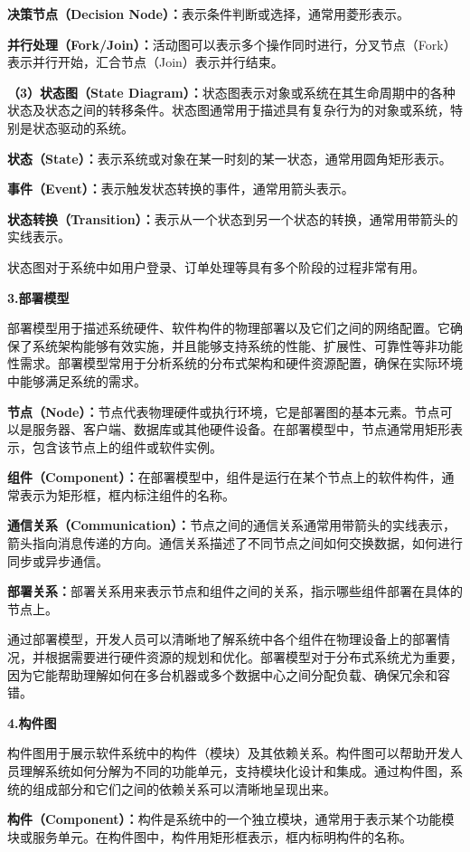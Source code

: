 \textbf{决策节点（Decision Node）：}表示条件判断或选择，通常用菱形表示。

\textbf{并行处理（Fork/Join）：}活动图可以表示多个操作同时进行，分叉节点（Fork）表示并行开始，汇合节点（Join）表示并行结束。

\textbf{（3）状态图（State Diagram）：}状态图表示对象或系统在其生命周期中的各种状态及状态之间的转移条件。状态图通常用于描述具有复杂行为的对象或系统，特别是状态驱动的系统。

\textbf{状态（State）：}表示系统或对象在某一时刻的某一状态，通常用圆角矩形表示。

\textbf{事件（Event）：}表示触发状态转换的事件，通常用箭头表示。

\textbf{状态转换（Transition）：}表示从一个状态到另一个状态的转换，通常用带箭头的实线表示。

状态图对于系统中如用户登录、订单处理等具有多个阶段的过程非常有用。

\textbf{3.部署模型}

部署模型用于描述系统硬件、软件构件的物理部署以及它们之间的网络配置。它确保了系统架构能够有效实施，并且能够支持系统的性能、扩展性、可靠性等非功能性需求。部署模型常用于分析系统的分布式架构和硬件资源配置，确保在实际环境中能够满足系统的需求。

\textbf{节点（Node）：}节点代表物理硬件或执行环境，它是部署图的基本元素。节点可以是服务器、客户端、数据库或其他硬件设备。在部署模型中，节点通常用矩形表示，包含该节点上的组件或软件实例。

\textbf{组件（Component）：}在部署模型中，组件是运行在某个节点上的软件构件，通常表示为矩形框，框内标注组件的名称。

\textbf{通信关系（Communication）：}节点之间的通信关系通常用带箭头的实线表示，箭头指向消息传递的方向。通信关系描述了不同节点之间如何交换数据，如何进行同步或异步通信。

\textbf{部署关系：}部署关系用来表示节点和组件之间的关系，指示哪些组件部署在具体的节点上。

通过部署模型，开发人员可以清晰地了解系统中各个组件在物理设备上的部署情况，并根据需要进行硬件资源的规划和优化。部署模型对于分布式系统尤为重要，因为它能帮助理解如何在多台机器或多个数据中心之间分配负载、确保冗余和容错。

\textbf{4.构件图}

构件图用于展示软件系统中的构件（模块）及其依赖关系。构件图可以帮助开发人员理解系统如何分解为不同的功能单元，支持模块化设计和集成。通过构件图，系统的组成部分和它们之间的依赖关系可以清晰地呈现出来。

\textbf{构件（Component）：}构件是系统中的一个独立模块，通常用于表示某个功能模块或服务单元。在构件图中，构件用矩形框表示，框内标明构件的名称。

